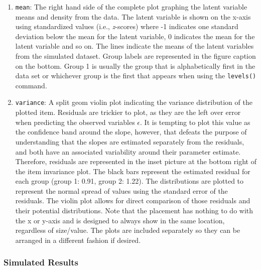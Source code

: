 \documentclass[
  man]{apa7}
\begin{document}
\begin{enumerate}
\def\labelenumi{\arabic{enumi})}
\setcounter{enumi}{2}
\item
  \texttt{mean}: The right hand side of the complete plot graphing the latent variable means and density from the data. The latent variable is shown on the x-axis using standardized values (i.e., \emph{z}-scores) where -1 indicates one standard deviation below the mean for the latent variable, 0 indicates the mean for the latent variable and so on. The lines indicate the means of the latent variables from the simulated dataset. Group labels are represented in the figure caption on the bottom. Group 1 is usually the group that is alphabetically first in the data set or whichever group is the first that appears when using the \texttt{levels()} command.
\item
  \texttt{variance}: A split geom violin plot indicating the variance distribution of the plotted item. Residuals are trickier to plot, as they are the left over error when predicting the observed variables \(\epsilon\). It is tempting to plot this value as the confidence band around the slope, however, that defeats the purpose of understanding that the slopes are estimated separately from the residuals, and both have an associated variability around their parameter estimate. Therefore, residuals are represented in the inset picture at the bottom right of the item invariance plot. The black bars represent the estimated residual for each group (group 1: 0.91, group 2: 1.22). The distributions are plotted to represent the normal spread of values using the standard error of the residuals. The violin plot allows for direct comparison of those residuals and their potential distributions. Note that the placement has nothing to do with the x or y-axis and is designed to always show in the same location, regardless of size/value. The plots are included separately so they can be arranged in a different fashion if desired.
\end{enumerate}

\hypertarget{simulated-results}{%
\subsubsection{Simulated Results}\label{simulated-results}}
\end{document}
